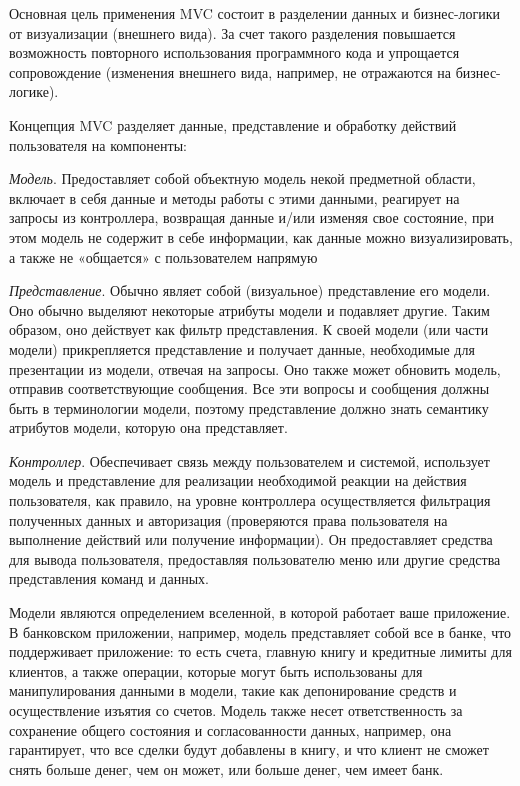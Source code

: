 Основная цель применения MVC состоит в разделении данных и бизнес-логики от визуализации (внешнего вида). За счет такого разделения повышается возможность повторного использования программного кода и упрощается сопровождение (изменения внешнего вида, например, не отражаются на бизнес-логике).

Концепция MVC разделяет данные, представление и обработку действий пользователя на компоненты:

\textit{Модель}. Предоставляет собой объектную модель некой предметной области, включает в себя данные и методы работы с этими данными, реагирует на запросы из контроллера, возвращая данные и/или изменяя свое состояние, при этом модель не содержит в себе информации, как данные можно визуализировать, а также не «общается» с пользователем напрямую

\textit{Представление}. Обычно являет собой (визуальное) представление его модели. Оно обычно выделяют некоторые атрибуты модели и подавляет другие. Таким образом, оно действует как фильтр представления. К своей модели (или части модели) прикрепляется представление и получает данные, необходимые для презентации из модели, отвечая на запросы. Оно также может обновить модель, отправив соответствующие сообщения. Все эти вопросы и сообщения должны быть в терминологии модели, поэтому представление должно знать семантику атрибутов модели, которую она представляет.

\textit{Контроллер}. Обеспечивает связь между пользователем и системой, использует модель и представление для реализации необходимой реакции на действия пользователя, как правило, на уровне контроллера осуществляется фильтрация полученных данных и авторизация (проверяются права пользователя на выполнение действий или получение информации).  Он предоставляет средства для вывода пользователя, предоставляя пользователю меню или другие средства представления команд и данных.

Модели являются определением вселенной, в которой работает ваше приложение. В банковском приложении, например, модель представляет собой все в банке, что поддерживает приложение: то есть счета, главную книгу и кредитные лимиты для клиентов, а также операции, которые могут быть использованы для манипулирования данными в модели, такие как депонирование средств и осуществление изъятия со счетов. Модель также несет ответственность за сохранение общего состояния и согласованности данных, например, она гарантирует, что все сделки будут добавлены в книгу, и что клиент не сможет снять больше денег, чем он может, или больше денег, чем имеет банк.

